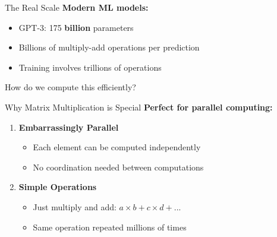\documentclass[10pt]{beamer}
\begin{document}
\begin{frame}{The Real Scale}
  \textbf{Modern ML models:}
  
  \vspace{1em}
  \begin{itemize}
    \item GPT-3: 175 \textbf{billion} parameters
    \item Billions of multiply-add operations per prediction
    \item Training involves trillions of operations
  \end{itemize}
  
  \vspace{2em}
  \centering
  \Large How do we compute this efficiently?
\end{frame}

\begin{frame}{Why Matrix Multiplication is Special}
  \textbf{Perfect for parallel computing:}
  
  \vspace{1em}
  \begin{enumerate}
    \item \textbf{Embarrassingly Parallel}
    \begin{itemize}
      \item Each element can be computed independently
      \item No coordination needed between computations
    \end{itemize}
    
    \vspace{0.5em}
    \item \textbf{Simple Operations}
    \begin{itemize}
      \item Just multiply and add: $a \times b + c \times d + ...$
      \item Same operation repeated millions of times
    \end{itemize}
    
  \end{enumerate}
\end{frame}
\end{document}
